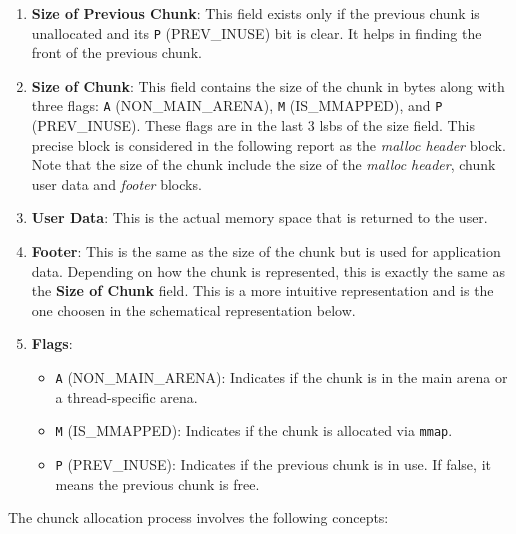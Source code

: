    \begin{enumerate}
        \item \textbf{Size of Previous Chunk}: This field exists only if the previous chunk is unallocated and its \texttt{P} (PREV\_INUSE) bit is clear. It helps in finding the front of the previous chunk.
        
        \item \textbf{Size of Chunk}: This field contains the size of the chunk in bytes along with three flags: \texttt{A} (NON\_MAIN\_ARENA), \texttt{M} (IS\_MMAPPED), and \texttt{P} (PREV\_INUSE). These flags are in the last 3 \acrshort{lsb}s of the size field. This precise block is considered in the following report as the \textit{malloc header} block. Note that the size of the chunk include the size of the \textit{malloc header}, chunk user data and \textit{footer} blocks.
        
        \item \textbf{User Data}: This is the actual memory space that is returned to the user.
        
        \item \textbf{Footer}: This is the same as the size of the chunk but is used for application data. Depending on how the chunk is represented, this is exactly the same as the \textbf{Size of Chunk} field. This is a more intuitive representation and is the one choosen in the schematical representation below.
        
        \item \textbf{Flags}:
        \begin{itemize}
            \item \texttt{A} (NON\_MAIN\_ARENA): Indicates if the chunk is in the main arena or a thread-specific arena.
            \item \texttt{M} (IS\_MMAPPED): Indicates if the chunk is allocated via \texttt{mmap}.
            \item \texttt{P} (PREV\_INUSE): Indicates if the previous chunk is in use. If false, it means the previous chunk is free.
        \end{itemize}
    \end{enumerate}

    The chunck allocation process involves the following concepts: 

